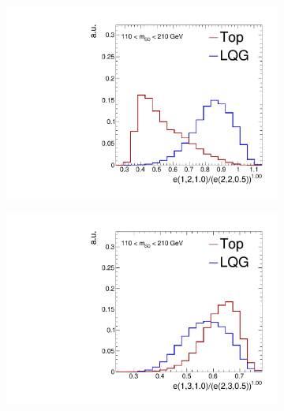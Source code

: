 \begin{figure}[]
    \begin{center}
        \begin{subfigure}[t]{0.32\textwidth}
            \includegraphics[width=\textwidth]{figures/toptagging/shapes/mass_ratio_12102205.pdf}
        \end{subfigure}
        \begin{subfigure}[t]{0.32\textwidth}
            \includegraphics[width=\textwidth]{figures/toptagging/shapes/mass_ratio_13102305.pdf}
        \end{subfigure}
        \begin{subfigure}[t]{0.32\textwidth}

\end{subfigure}
\end{center}
\end{figure}
